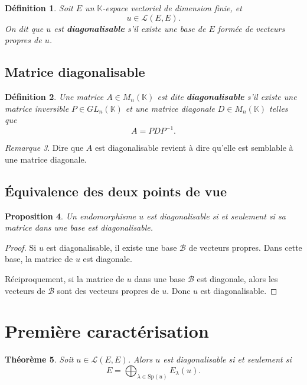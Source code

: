 \documentclass[11pt,a4paper]{article}
\newtheorem{definition}{Définition}[section]
\newtheorem{theoreme}[definition]{Théorème}
\newtheorem{proposition}[definition]{Proposition}
\theoremstyle{remark}
\newtheorem{remarque}[definition]{Remarque}
\newcommand{\K}{\mathbb{K}}
\newcommand{\Sp}{\mathrm{Sp}}
\begin{document}
\begin{definition}
Soit \(E\) un \(\K\)-espace vectoriel de dimension finie, et
\[
u\in \mathcal L(E,E).
\]
On dit que \(u\) est \textbf{diagonalisable} s’il existe une base de \(E\) formée de vecteurs propres de \(u\).
\end{definition}

\subsection{Matrice diagonalisable}

\begin{definition}
Une matrice \(A\in M_n(\K)\) est dite \textbf{diagonalisable} s’il existe une matrice inversible \(P\in GL_n(\K)\) et une matrice diagonale \(D\in M_n(\K)\) telles que
\[
A=PDP^{-1}.
\]
\end{definition}

\begin{remarque}
Dire que \(A\) est diagonalisable revient à dire qu’elle est semblable à une matrice diagonale.
\end{remarque}

\subsection{Équivalence des deux points de vue}

\begin{proposition}
Un endomorphisme \(u\) est diagonalisable si et seulement si sa matrice dans une base est diagonalisable.
\end{proposition}

\begin{proof}
Si \(u\) est diagonalisable, il existe une base \(\mathcal B\) de vecteurs propres. Dans cette base, la matrice de \(u\) est diagonale.

Réciproquement, si la matrice de \(u\) dans une base \(\mathcal B\) est diagonale, alors les vecteurs de \(\mathcal B\) sont des vecteurs propres de \(u\). Donc \(u\) est diagonalisable.
\end{proof}

\section{Première caractérisation}

\begin{theoreme}
Soit \(u\in \mathcal L(E,E)\). Alors \(u\) est diagonalisable si et seulement si
\[
E=\bigoplus_{\lambda\in\Sp(u)} E_\lambda(u).
\]
\end{theoreme}
\end{document}
